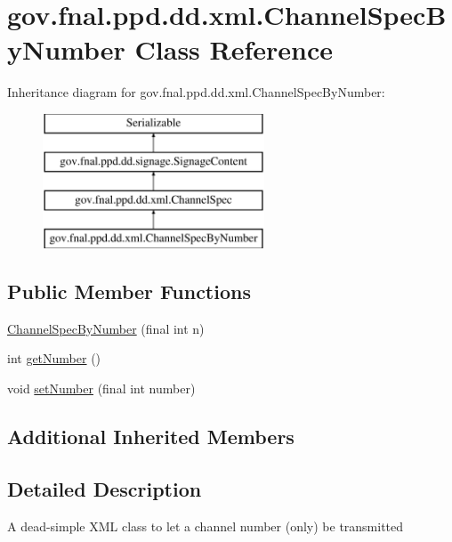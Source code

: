 \hypertarget{classgov_1_1fnal_1_1ppd_1_1dd_1_1xml_1_1ChannelSpecByNumber}{\section{gov.\-fnal.\-ppd.\-dd.\-xml.\-Channel\-Spec\-By\-Number Class Reference}
\label{classgov_1_1fnal_1_1ppd_1_1dd_1_1xml_1_1ChannelSpecByNumber}
}
Inheritance diagram for gov.\-fnal.\-ppd.\-dd.\-xml.\-Channel\-Spec\-By\-Number\-:\begin{figure}[H]
\begin{center}
\leavevmode
\includegraphics[height=4.000000cm]{classgov_1_1fnal_1_1ppd_1_1dd_1_1xml_1_1ChannelSpecByNumber}
\end{center}
\end{figure}
\subsection*{Public Member Functions}
\begin{DoxyCompactItemize}
\item 
\hyperlink{classgov_1_1fnal_1_1ppd_1_1dd_1_1xml_1_1ChannelSpecByNumber_ac165be7f17b3d006e49e48766b908abb}{Channel\-Spec\-By\-Number} (final int n)
\item 
int \hyperlink{classgov_1_1fnal_1_1ppd_1_1dd_1_1xml_1_1ChannelSpecByNumber_a48ec6af06f26b88ca832af86472c3588}{get\-Number} ()
\item 
void \hyperlink{classgov_1_1fnal_1_1ppd_1_1dd_1_1xml_1_1ChannelSpecByNumber_a8a1b1699955fa0a62de6e20ca1549445}{set\-Number} (final int number)
\end{DoxyCompactItemize}
\subsection*{Additional Inherited Members}


\subsection{Detailed Description}
A dead-\/simple X\-M\-L class to let a channel number (only) be transmitted

